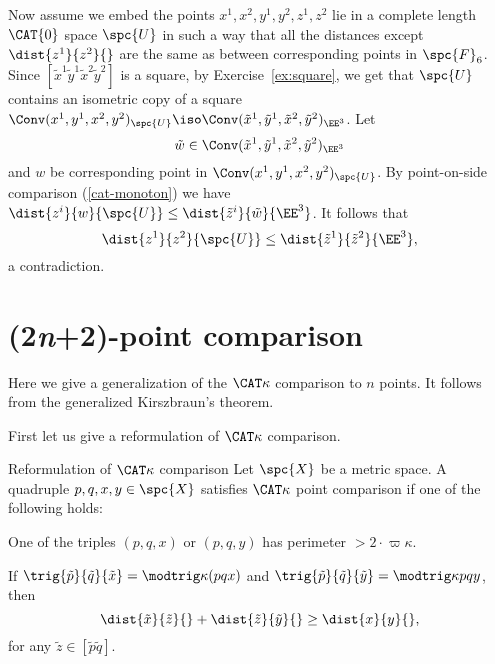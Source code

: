 Now assume we embed the points $x^1,x^2,y^1,y^2,z^1,z^2$ lie in a complete length $\CAT{0}$ space $\spc{U}$ in such a way that all the distances except $\dist{z^1}{z^2}{}$ are the same as between corresponding points in $\spc{F}_6$.
Since $[\tilde x^1\tilde y^1\tilde x^2\tilde y^2]$ is a square,
by Exercise~\ref{ex:square}, 
we get that $\spc{U}$ contains an isometric copy of a square $\Conv(x^1,y^1,x^2,y^2)_{\spc{U}}\iso\Conv(\tilde x^1,\tilde y^1,\tilde x^2,\tilde y^2)_{\EE^3}$.
Let \[\tilde w\in  \Conv(\tilde x^1,\tilde y^1,\tilde x^2,\tilde y^2)_{\EE^3}\]
and $w$ be corresponding point in $\Conv(x^1,y^1,x^2,y^2)_{\spc{U}}$.
By 
point-on-side comparison (\ref{cat-monoton}) we have $\dist{z^i}{w}{\spc{U}}\le \dist{\tilde z^i}{\tilde w}{\EE^3}$.
It follows that 
\[\dist{z^1}{z^2}{\spc{U}}
\le
\dist{\tilde z^1}{\tilde z^2}{\EE^3},\] 
a contradiction.%


















\section{(2\textit{n}+2)-point comparison}\label{sec:2n+2}

Here we give a generalization of the $\CAT\kappa$  comparison  to $n$ points.
It follows from the generalized Kirszbraun's theorem.

First let us give a reformulation of $\CAT\kappa$ comparison. 

\begin{thm}{Reformulation of $\CAT\kappa$ comparison}
Let $\spc{X}$ be a metric space.
A quadruple $p,q,x,y\in \spc{X}$ satisfies $\CAT\kappa$ point comparison if one of the following holds:
\begin{subthm}{}
One of the triples 
$(p,q,x)$ 
or 
$(p, q, y)$ 
has perimeter $>2\cdot\varpi\kappa$.
\end{subthm}

\begin{subthm}{}
If $\trig{\tilde p}{\tilde q}{\tilde x}
=
\modtrig\kappa(p q x)$ 
and
$\trig{\tilde p}{\tilde q}{\tilde y}
=
\modtrig\kappa p q y$, then
\[\dist{\tilde x}{\tilde z}{}+\dist{\tilde z}{\tilde y}{}\ge \dist{x}{y}{},\]
for any $\tilde z\in[\tilde p\tilde q]$.

\end{subthm}

\end{thm}

